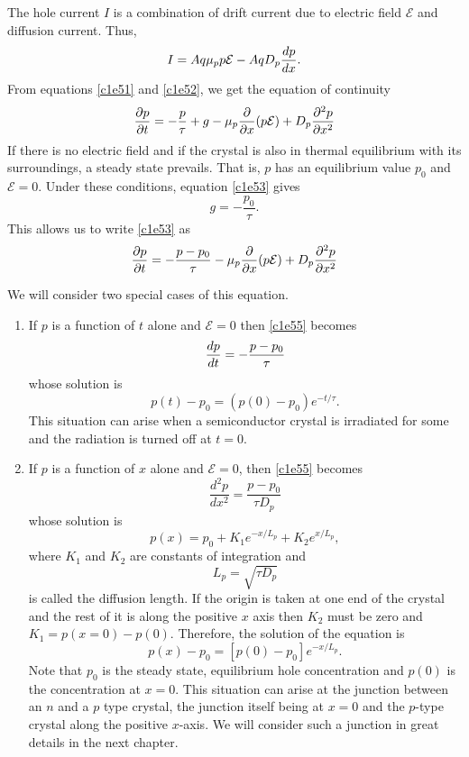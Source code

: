 The hole current $I$ is a combination of drift current due to electric field
$\mathcal{E}$ and diffusion current. Thus,
\begin{equation}\label{c1e52}
I = Aq\mu_p p\mathcal{E} - AqD_p\frac{d{p}}{d{x}}.
\end{equation}
From equations \eqref{c1e51} and \eqref{c1e52}, we get the equation of 
continuity
\begin{equation}\label{c1e53}
\frac{\partial{p}}{\partial{t}} = -\frac{p}{\tau} + g -\mu_p\frac{\partial}{\partial x}(p\mathcal{E})
+ D_p\frac{\partial^2p}{\partial x^2}
\end{equation}
If there is no electric field and if the crystal is also in thermal equilibrium
with its surroundings, a steady state prevails. That is, $p$ has an equilibrium
value $p_0$ and $\mathcal{E} = 0$. Under these conditions, equation 
\eqref{c1e53} gives
\begin{equation}\label{c1e54}
g = -\frac{p_0}{\tau}.
\end{equation}
This allows us to write \eqref{c1e53} as
\begin{equation}\label{c1e55}
\frac{\partial{p}}{\partial{t}} = -\frac{p - p_0}{\tau} -
\mu_p\frac{\partial}{\partial x}(p\mathcal{E}) +
D_p\frac{\partial^2p}{\partial x^2}
\end{equation}

We will consider two special cases of this equation.
\begin{enumerate}
\item If $p$ is a function of $t$ alone and $\mathcal{E} = 0$ then \eqref{c1e55}
becomes
\[
\frac{d{p}}{d{t}} = -\frac{p - p_0}{\tau}
\]
whose solution is
\begin{equation}\label{c1e56}
p(t) - p_0 = (p(0) - p_0)e^{-t/\tau}.
\end{equation}
This situation can arise when a semiconductor crystal is irradiated for some
and the radiation is turned off at $t = 0$.

\item If $p$ is a function of $x$ alone and $\mathcal{E} = 0$, then 
\eqref{c1e55} becomes
\[
\frac{d^2p}{dx^2} = \frac{p - p_0}{\tau D_p}
\]
whose solution is 
\[
p(x) = p_0 + K_1 e^{-x/L_p} + K_2 e^{x/L_p},
\]
where $K_1$ and $K_2$ are constants of integration and
\begin{equation}\label{c1e57}
L_p = \sqrt{\tau D_p}
\end{equation}
is called the diffusion length. If the origin is taken at one end of the crystal
and the rest of it is along the positive $x$ axis then $K_2$ must be zero and
$K_1 = p(x=0) - p(0)$. Therefore, the solution of the equation is
\begin{equation}\label{c1e58}
p(x) - p_0 = [p(0) - p_0]e^{-x/L_p}.
\end{equation}
Note that $p_0$ is the steady state, equilibrium hole concentration and $p(0)$
is the concentration at $x = 0$. This situation can arise at the junction 
between an $n$ and a $p$ type crystal, the junction itself being at $x=0$ and
the $p$-type crystal along the positive $x$-axis. We will consider such a 
junction in great details in the next chapter.
\end{enumerate}
